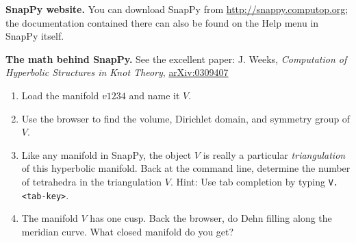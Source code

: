 \documentclass[tikz, a4paper]{nmd/hw}
\begin{document}

\textbf{SnapPy website.} You can download SnapPy from
\url{http://snappy.computop.org}; the documentation contained there
can also be found on the Help menu in SnapPy itself. 

\textbf{The math behind SnapPy.}  See the excellent paper: J. Weeks, \emph{Computation of Hyperbolic Structures in Knot Theory}, \href{http://arxiv.org/abs/math/0309407}{arXiv:0309407}

\begin{problems}
  \item 
    \begin{enumerate}
      \item Load the manifold $v1234$ and name it $V$.  
      \item Use the browser to find the volume, Dirichlet domain, and
        symmetry group of $V$.
      \item Like any manifold in SnapPy, the object $V$ is really a
        particular \emph{triangulation} of this hyperbolic manifold.
        Back at the command line, determine the number of tetrahedra
        in the triangulation $V$.  Hint: Use tab completion by
        typing \texttt{V.<tab-key>}.  
      \item The manifold $V$ has one cusp.  Back the browser, do Dehn
        filling along the meridian curve.  What closed manifold do you get?  
    \end{enumerate}
 

\end{problems}
\end{document}

